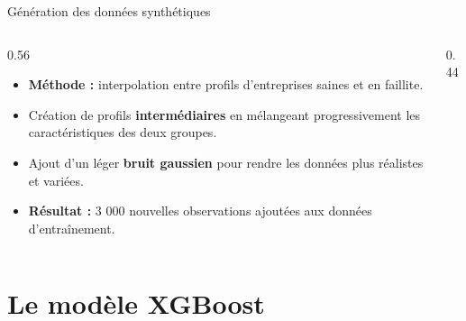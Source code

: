 \documentclass[10pt,aspectratio=169]{beamer}
\begin{document}
\begin{frame}{Génération des données synthétiques}
  \begin{columns}[T]
    \begin{column}{0.56\textwidth}
      \begin{itemize}
        \small
        \item \textbf{Méthode :} interpolation entre profils
              d'entreprises saines et en faillite.
        \item Création de profils \textbf{intermédiaires} en mélangeant
              progressivement les caractéristiques des deux groupes.
        \item Ajout d'un léger \textbf{bruit gaussien} pour rendre les
              données plus réalistes et variées.
        \item \textbf{Résultat :} 3 000 nouvelles observations ajoutées
              aux données d'entraînement.
      \end{itemize}
    \end{column}
    \begin{column}{0.44\textwidth}
      \centering
    \end{column}
  \end{columns}
\end{frame}

\section{Le modèle XGBoost}
\end{document}
